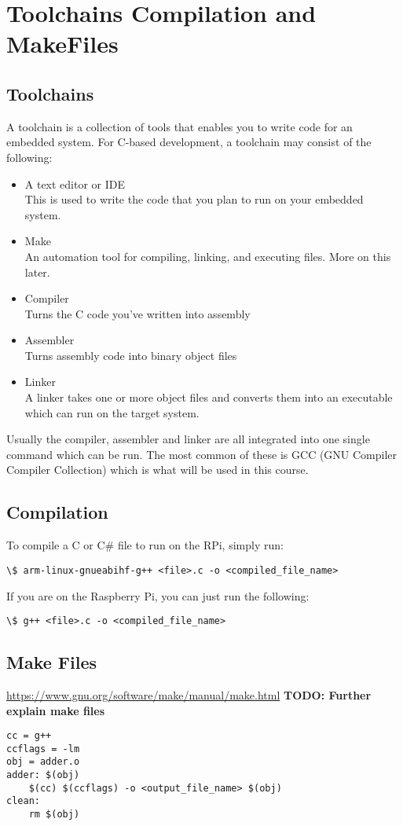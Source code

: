 \section{Toolchains Compilation and MakeFiles}
\subsection{Toolchains}
A toolchain is a collection of tools that enables you to write code for an embedded system. For C-based development, a toolchain may consist of the following:
\begin{itemize}
    \item A text editor or IDE\\
    This is used to write the code that you plan to run on your embedded system.
    \item Make\\
    An automation tool for compiling, linking, and executing files. More on this later.
    \item Compiler\\
    Turns the C code you've written into assembly
    \item Assembler\\
    Turns assembly code into binary object files
    \item Linker\\
    A linker takes one or more object files and converts them into an executable which can run on the target system.
\end{itemize}

Usually the compiler, assembler and linker are all integrated into one single command which can be run. The most common of these is GCC (GNU Compiler Compiler Collection) which is what will be used in this course.

\subsection{Compilation}
To compile a C or C\# file to run on the RPi, simply run:
\begin{verbatim}
\$ arm-linux-gnueabihf-g++ <file>.c -o <compiled_file_name>
\end{verbatim}
If you are on the Raspberry Pi, you can just run the following:
\begin{verbatim}
\$ g++ <file>.c -o <compiled_file_name>
\end{verbatim}
\subsection{Make Files}
\href{https://www.gnu.org/software/make/manual/make.html}{https://www.gnu.org/software/make/manual/make.html}
\textbf{TODO: Further explain make files}
\begin{verbatim}
cc = g++
ccflags = -lm
obj = adder.o
adder: $(obj)
    $(cc) $(ccflags) -o <output_file_name> $(obj)
clean: 
    rm $(obj)
\end{verbatim}

